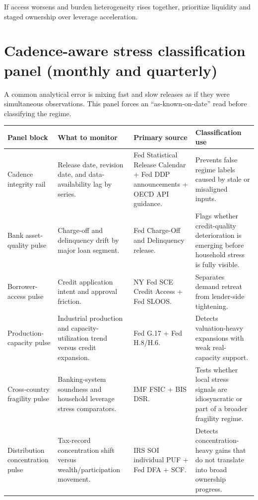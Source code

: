 \documentclass[11pt,openany]{book}
\begin{document}
If access worsens and burden heterogeneity rises together, prioritize liquidity and staged ownership over leverage acceleration.

\section{Cadence-aware stress classification panel (monthly and quarterly)}

A common analytical error is mixing fast and slow releases as if they were simultaneous observations.
This panel forces an ``as-known-on-date'' read before classifying the regime.

\begin{center}
\small
\begin{tabularx}{\textwidth}{>{\raggedright\arraybackslash}p{}>{\raggedright\arraybackslash}p{}>{\raggedright\arraybackslash}p{}X}
\toprule
\textbf{Panel block} & \textbf{What to monitor} & \textbf{Primary source} & \textbf{Classification use} \\
\midrule
Cadence integrity rail & Release date, revision date, and data-availability lag by series. & Fed Statistical Release Calendar + Fed DDP announcements + OECD API guidance. & Prevents false regime labels caused by stale or misaligned inputs. \\
Bank asset-quality pulse & Charge-off and delinquency drift by major loan segment. & Fed Charge-Off and Delinquency release. & Flags whether credit-quality deterioration is emerging before household stress is fully visible. \\
Borrower-access pulse & Credit application intent and approval friction. & NY Fed SCE Credit Access + Fed SLOOS. & Separates demand retreat from lender-side tightening. \\
Production-capacity pulse & Industrial production and capacity-utilization trend versus credit expansion. & Fed G.17 + Fed H.8/H.6. & Detects valuation-heavy expansions with weak real-capacity support. \\
Cross-country fragility pulse & Banking-system soundness and household leverage stress comparators. & IMF FSIC + BIS DSR. & Tests whether local stress signals are idiosyncratic or part of a broader fragility regime. \\
Distribution concentration pulse & Tax-record concentration shift versus wealth/participation movement. & IRS SOI individual PUF + Fed DFA + SCF. & Detects concentration-heavy gains that do not translate into broad ownership progress. \\
\bottomrule
\end{tabularx}
\normalsize
\end{center}
\end{document}

